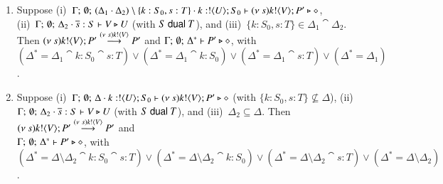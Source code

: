 \begin{lemma}
\begin{enumerate}[1.]
\item Suppose (i)~$\Gamma;\, \emptyset;\, (\Delta_1 \cdot \Delta_2) \setminus \{k:S_0, s:T\} \cdot k:! \langle U \rangle ; S_0 
\vdash (\nu\ s)k ! \langle V \rangle ; P' \triangleright \diamond$, \\
(ii)~$\Gamma;\, \emptyset;\, \Delta_2 \cdot \overline{s}:S \vdash V \triangleright U$ (with $S \ \mathsf{dual}\  T$),
and (iii)~$\{k:S_0, s:T\} \in \Delta_1 \cat \Delta_2$. \\
Then 
$(\nu\ s)k ! \langle V \rangle ; P' \stackrel{(\nu\ s)k ! \langle V \rangle}{\longrightarrow} P'$
and $\Gamma;\, \emptyset;\, \Delta^* \vdash P' \triangleright \diamond$, with \\
$(\Delta^* = \Delta_1 \cat k:S_0 \cat s:T) \lor (\Delta^* = \Delta_1 \cat k:S_0) \lor
(\Delta^* = \Delta_1 \cat  s:T) \lor (\Delta^* = \Delta_1)$.


\item Suppose (i)~$\Gamma;\, \emptyset;\, \Delta \cdot k:! \langle U \rangle ; S_0 
\vdash (\nu\ s)k ! \langle V \rangle ; P' \triangleright \diamond$
(with $\{k:S_0, s:T\} \not\subseteq \Delta$), 
(ii)~$\Gamma;\, \emptyset;\, \Delta_2 \cdot \overline{s}:S \vdash V \triangleright U$ (with $S \ \mathsf{dual}\  T$),
and (iii)~$\Delta_2 \subseteq \Delta$. 
Then $(\nu\ s)k ! \langle V \rangle ; P' \stackrel{(\nu\ s)k ! \langle V \rangle}{\longrightarrow} P'$ and \\
$\Gamma;\, \emptyset;\, \Delta^* \vdash P' \triangleright \diamond$, with \\
$(\Delta^* = \Delta \setminus \Delta_2 \cat k:S_0 \cat s:T) \lor (\Delta^* = \Delta \setminus \Delta_2 \cat k:S_0) \lor
(\Delta^* = \Delta \setminus \Delta_2 \cat  s:T) \lor (\Delta^* = \Delta \setminus \Delta_2)$.


\end{enumerate}
\end{lemma}


